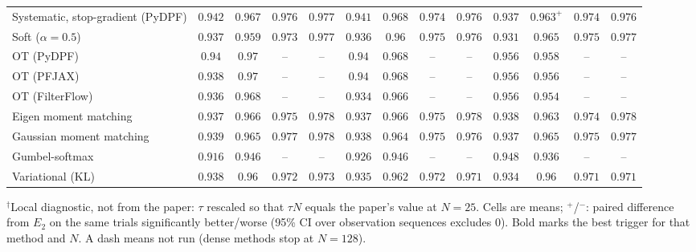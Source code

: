\begin{table}[ht]
\begin{adjustbox}{max width=\linewidth}
\begin{tabular}{lcccc|cccc|cccc}
Systematic, stop-gradient (PyDPF) & $\mathbf{0.942}$ & $0.967$ & $0.976$ & $0.977$ & $0.941$ & $0.968$ & $\mathbf{0.974}$ & $\mathbf{0.976}$ & $0.937$ & $\mathbf{0.963}^{+}$ & $\mathbf{0.974}$ & $0.976$ \\
Soft ($\alpha{=}0.5$) & $\mathbf{0.937}$ & $\mathbf{0.959}$ & $\mathbf{0.973}$ & $0.977$ & $0.936$ & $0.96$ & $0.975$ & $\mathbf{0.976}$ & $0.931$ & $0.965$ & $0.975$ & $0.977$ \\
OT (PyDPF) & $0.94$ & $0.97$ & -- & -- & $0.94$ & $0.968$ & -- & -- & $\mathbf{0.956}$ & $\mathbf{0.958}$ & -- & -- \\
OT (PFJAX) & $0.938$ & $0.97$ & -- & -- & $0.94$ & $0.968$ & -- & -- & $\mathbf{0.956}$ & $\mathbf{0.956}$ & -- & -- \\
OT (FilterFlow) & $0.936$ & $0.968$ & -- & -- & $0.934$ & $0.966$ & -- & -- & $\mathbf{0.956}$ & $\mathbf{0.954}$ & -- & -- \\
Eigen moment matching & $0.937$ & $0.966$ & $0.975$ & $0.978$ & $0.937$ & $0.966$ & $0.975$ & $0.978$ & $\mathbf{0.938}$ & $\mathbf{0.963}$ & $\mathbf{0.974}$ & $\mathbf{0.978}$ \\
Gaussian moment matching & $\mathbf{0.939}$ & $0.965$ & $0.977$ & $0.978$ & $0.938$ & $\mathbf{0.964}$ & $\mathbf{0.975}$ & $\mathbf{0.976}$ & $0.937$ & $0.965$ & $0.975$ & $0.977$ \\
Gumbel-softmax & $0.916$ & $\mathbf{0.946}$ & -- & -- & $0.926$ & $\mathbf{0.946}$ & -- & -- & $\mathbf{0.948}$ & $0.936$ & -- & -- \\
Variational (KL) & $\mathbf{0.938}$ & $0.96$ & $0.972$ & $0.973$ & $0.935$ & $0.962$ & $0.972$ & $\mathbf{0.971}$ & $0.934$ & $\mathbf{0.96}$ & $\mathbf{0.971}$ & $0.971$ \\
\bottomrule
\end{tabular}
\end{adjustbox}
\par\smallskip\parbox{0.95\linewidth}{\footnotesize $^\dagger$Local diagnostic, not from the paper: $\tau$ rescaled so that $\tau N$ equals the paper's value at $N{=}25$. Cells are means; $^{+}$/$^{-}$: paired difference from $E_2$ on the same trials significantly better/worse (95\% CI over observation sequences excludes 0). Bold marks the best trigger for that method and $N$. A dash means not run (dense methods stop at $N{=}128$).}
\end{table}

